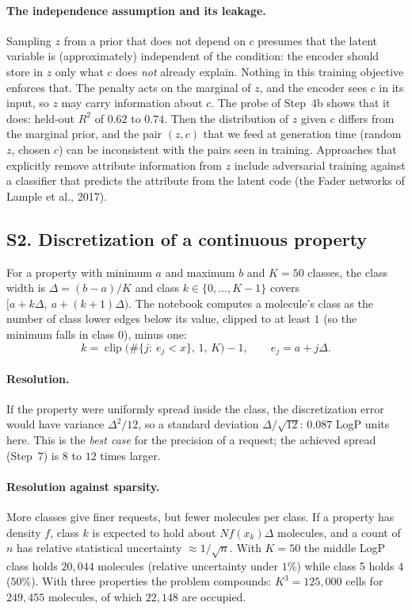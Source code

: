 \documentclass[11pt]{article}
\begin{document}
\paragraph{The independence assumption and its leakage.} Sampling $z$ from a prior that does not depend on $c$ presumes that the latent variable is (approximately) independent of the condition: the encoder should store in $z$ only what $c$ does \emph{not} already explain. Nothing in this training objective enforces that. The penalty acts on the marginal of $z$, and the encoder sees $c$ in its input, so $z$ may carry information about $c$. The probe of Step~4b shows that it does: held-out $R^2$ of $0.62$ to $0.74$. Then the distribution of $z$ given $c$ differs from the marginal prior, and the pair $(z,c)$ that we feed at generation time (random $z$, chosen $c$) can be inconsistent with the pairs seen in training. Approaches that explicitly remove attribute information from $z$ include adversarial training against a classifier that predicts the attribute from the latent code (the Fader networks of Lample et al., 2017).

\label{sec:S2}
\subsection*{S2. Discretization of a continuous property}
For a property with minimum $a$ and maximum $b$ and $K=50$ classes, the class width is $\Delta=(b-a)/K$ and class $k\in\{0,\dots,K-1\}$ covers $[a+k\Delta,\ a+(k+1)\Delta)$. The notebook computes a molecule's class as the number of class lower edges below its value, clipped to at least $1$ (so the minimum falls in class 0), minus one:
\[
  k=\operatorname{clip}\big(\#\{j:\ e_j<x\},\,1,\,K\big)-1,\qquad e_j=a+j\Delta .
\]
\paragraph{Resolution.} If the property were uniformly spread inside the class, the discretization error would have variance $\Delta^2/12$, so a standard deviation $\Delta/\sqrt{12}$: $0.087$ LogP units here. This is the \emph{best case} for the precision of a request; the achieved spread (Step~7) is $8$ to $12$ times larger.

\paragraph{Resolution against sparsity.} More classes give finer requests, but fewer molecules per class. If a property has density $f$, class $k$ is expected to hold about $N f(x_k)\Delta$ molecules, and a count of $n$ has relative statistical uncertainty $\approx1/\sqrt n$. With $K=50$ the middle LogP class holds $20{,}044$ molecules (relative uncertainty under $1\%$) while class 5 holds $4$ ($50\%$). With three properties the problem compounds: $K^3=125{,}000$ cells for $249{,}455$ molecules, of which $22{,}148$ are occupied.
\end{document}
